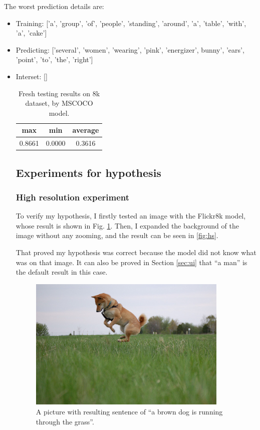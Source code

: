 \documentclass[10pt,twocolumn,letterpaper]{article}
\begin{document}
The worst prediction details are:
\begin{itemize}
    \item Training: ['a', 'group', 'of', 'people', 'standing', 'around', 'a', 'table', 'with', 'a', 'cake']
    \item Predicting: ['several', 'women', 'wearing', 'pink', 'energizer', bunny', 'ears', 'point', 'to', 'the', 'right']
    \item Interset: []

\begin{table}[]
\centering
\begin{tabular}{ccc}
\hline
max    & min    & average \\ \hline
0.8661 & 0.0000 & 0.3616  \\ \hline
\end{tabular}
\caption{Fresh testing results on 8k dataset, by MSCOCO model.}
\label{tab:fresh2}
\end{table}


\subsection{Experiments for hypothesis}
\subsubsection{High resolution experiment} \label{sec:hs}
To verify my hypothesis, I firstly tested an image with the Flickr8k model, whose result is shown in Fig. \ref{fig:hsori}.
Then, I expanded the background of the image without any zooming, and the result can be seen in \ref{fig:hs}.

That proved my hypothesis was correct because the model did not know what was on that image.
It can also be proved in Section \ref{sec:ui} that ``a man'' is the default result in this case.

\begin{figure}
    \begin{center}
        \includegraphics[width=0.9\textwidth]{2584487952_f70e5aa9bf.ori.jpg}
    \end{center}
    \caption{A picture with resulting sentence of ``a brown dog is running through the grass''.}
    \label{fig:hsori}
\end{figure}


\end{itemize}
\end{document}
